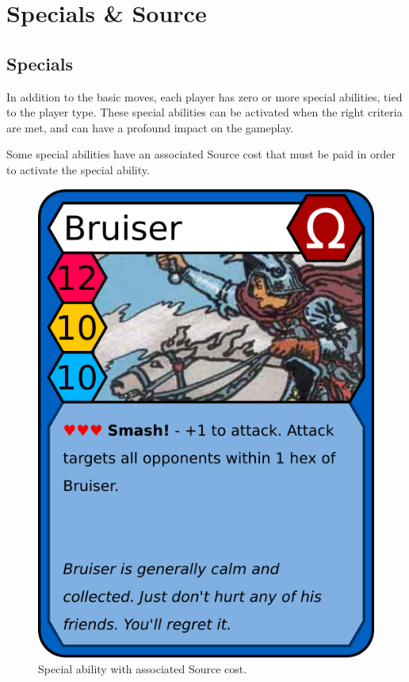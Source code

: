 \section{Specials \& Source}\label{energy}
\subsection{Specials}
In addition to the basic moves, each player has zero or more special abilities, tied to the player type.
These special abilities can be activated when the right criteria are met, and can have a profound impact on the gameplay.

Some special abilities have an associated Source cost that must be paid in order to activate the special ability.

\begin{figure}
    \centering
    \includegraphics{graphics/bruiser-red.png}
    \caption{Special ability with associated Source cost.}
    \label{fig:ability-example}
\end{figure}

